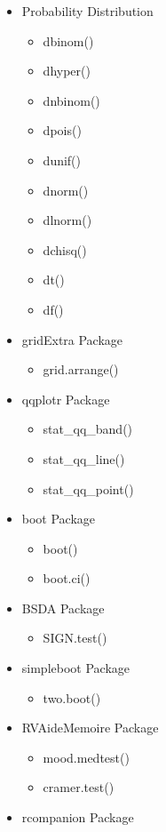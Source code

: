 \documentclass{article}
\begin{document}
\begin{multicols}{3}
\begin{itemize}
\begin{itemize}
  \end{itemize}
  \item Probability Distribution
  \begin{itemize}
    \item dbinom()
    \item dhyper()
    \item dnbinom()
    \item dpois()
    \item dunif()
    \item dnorm()
    \item dlnorm()
    \item dchisq()
    \item dt()
    \item df()
  \end{itemize}
  \item gridExtra Package
  \begin{itemize}
  \item grid.arrange()
  \end{itemize}
  \item qqplotr Package
  \begin{itemize}
    \item stat\_qq\_band()
    \item stat\_qq\_line()
    \item stat\_qq\_point()
  \end{itemize}
  \item boot Package
  \begin{itemize}
  \item boot()
  \item boot.ci()
  \end{itemize}
  \item BSDA Package
  \begin{itemize}
  \item SIGN.test()
  \end{itemize}
  \item simpleboot Package
  \begin{itemize}
  \item two.boot()
  \end{itemize}
  \item RVAideMemoire Package
  \begin{itemize}
  \item mood.medtest()
  \item cramer.test()
  \end{itemize}
  \item rcompanion Package
  \begin{itemize}

\end{itemize}
\end{itemize}
\end{multicols}
\end{document}
